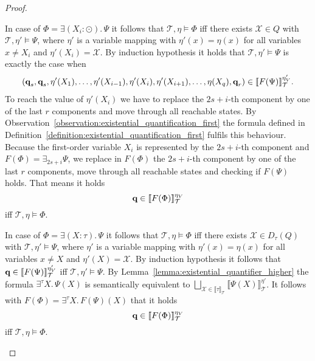 \begin{proof}
\begin{compactitem}
        \item In case of $\Phi = \exists (X_i\colon \odot).\,\Psi$ it follows that $\mathcal{T}, \eta \models \Phi$ iff
        there exists  $\mathcal{X} \in Q$ with $\mathcal{T}, \eta' \models \Psi$, where $\eta'$ is a variable mapping with $\eta'(x) = \eta(x)$ for all variables $x \neq X_i$ and $\eta'(X_i) = \mathcal{X}$. By induction hypothesis it holds that $\mathcal{T}, \eta' \models \Psi$ is exactly the case when
        \begin{align*}
            (\emph{q}_s, \emph{q}_s, \eta'(X_1), \dots, \eta'(X_{i-1}), \eta'(X_i), \eta'(X_{i+1}), \dots, \eta(X_{q}), \emph{q}_r) \in
            \llbracket F(\Psi) \rrbracket^{{\eta'_V}}_\mathcal{T}.
        \end{align*}
        To reach the value of $\eta'(X_i)$ we have to replace the $2s+i$-th component by one of 
        the last $r$ components and move through all reachable states. By Observation~\ref{observation:existential_quantification_first} the formula defined in Definition~\ref{definition:existential_quantification_first} fulfils this behaviour. Because the first-order variable $X_i$ is represented by the $2s+i$-th component and $F(\Phi) = \exists_{2s+i} \Psi$, we replace in $F(\Phi)$ the $2s+i$-th component by one of the last $r$ components, move through all reachable states and checking if $F(\Psi)$ holds. That means it holds 
        \[\emph{q} \in \llbracket F
        (\Phi) \rrbracket^{\eta_V}_\mathcal{T}\]
        iff $\mathcal{T}, \eta \models \Phi$.

        \item In case of $\Phi = \exists (X \colon \tau).\,\Psi$ it follows that $\mathcal{T}, \eta \models \Phi$ iff
        there exists $\mathcal{X} \in D_\tau(Q)$ with $\mathcal{T}, \eta' \models \Psi$, where $\eta'$ is a variable mapping with $\eta'(x) = \eta(x)$ for all variables $x \neq X$ and $\eta'(X) = \mathcal{X}$.
        By induction hypothesis it follows that $\emph{q} \in
        \llbracket F(\Psi) \rrbracket^{{\eta'_V}}_\mathcal{T}$ iff $\mathcal{T}, \eta' \models \Psi$. By Lemma~\ref{lemma:existential_quantifier_higher} the formula $\exists^\tau X.\, \Psi(X)$ is semantically equivalent to
        $\underset{\mathcal{X} \in \llbracket \tau \rrbracket_\mathcal{T}}{\bigsqcup} \llbracket \Psi(X) \rrbracket^{\eta'}_\mathcal{T}$.
        It follows with $F(\Phi) = \exists^\tau X.\, F(\Psi)(X)$ that it holds \[\emph{q} \in
        \llbracket F(\Phi) \rrbracket^{\eta_V}_\mathcal{T}\]
        iff $\mathcal{T},\eta \models \Phi$.
        

\end{compactitem}
\end{proof}
